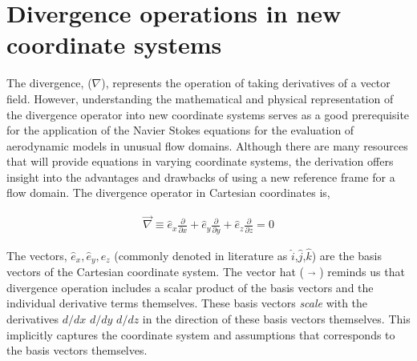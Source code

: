 \section{Divergence operations in new coordinate systems}


The divergence, ($\nabla$), represents the operation of taking derivatives of a vector field. However, understanding the mathematical and physical representation of the divergence operator into new coordinate systems serves as a good prerequisite for the application of the Navier Stokes equations for the evaluation of aerodynamic models in unusual flow domains. Although there are many resources that will provide equations in varying coordinate systems, the derivation offers insight into the advantages and drawbacks of using a new reference frame for a flow domain. The divergence operator in Cartesian coordinates is,



\begin{align*}
\vec{\nabla} \equiv
\hat{e}_x \frac{\partial }{\partial x}  %
+ \hat{e}_y \frac{\partial }{\partial y}  %
	+ \hat{e}_z \frac{\partial }{\partial z}                      = 0
\label{Divergence_Operator}
\end{align*}

The vectors, $\hat{e}_x,\hat{e}_y,\hat{e}_z$ (commonly denoted in literature as $\hat{i}$,$\hat{j}$,$\hat{k}$) are the basis vectors of the Cartesian coordinate system. The vector hat ( $\vec{}$ ) reminds us that divergence operation includes a scalar product of  the basis vectors and the individual derivative terms themselves.
These basis vectors \textit{scale} with the derivatives $d/dx$ $d/dy$ $d/dz$ in the direction of these basis vectors themselves. This implicitly captures the coordinate system and assumptions that corresponds to the basis vectors themselves.

